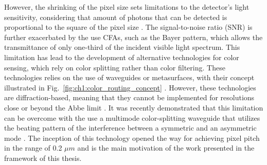 However, the shrinking of the pixel size sets limitations to the detector's light sensitivity, considering that amount of photons that can be detected is proportional to the square of the pixel size \cite{Kim2024FreeformSensors}. The signal-to-noise ratio (SNR) is further exacerbated by the use CFAs, such as the Bayer pattern, which allows the transmittance of only one-third of the incident visible light spectrum. This limitation has lead to the development of alternative technologies for color sensing, which rely on color splitting rather than color filtering. These technologies relies on the use of waveguides or metasurfaces, with their concept illustrated in Fig.~\ref{fig:ch1:color_routing_concept}   \cite{Nishiwaki2013EfficientSensors, Miyata2019High-SensitivityMetasurfaces, Kim2024FreeformSensors, Zou2022Pixel-levelMetasurfaces, Catrysse2022SubwavelengthEfficiency}. However, these technologies are diffraction-based, meaning that they cannot be implemented for resolutions close or beyond the Abbe limit \cite{Shramkova2024HighSeparation}. It was recently demonstrated that this limitation can be overcome with the use a multimode color-splitting waveguide that utilizes the beating pattern of the interference between a symmetric and an asymmetric mode \cite{Kang2023Wafer-level-integratedSplitters}. The inception of this technology opened the way for achieving pixel pitch in the range of 0.2 $\mu m$ and is the main motivation of the work presented in the framework of this thesis. 



